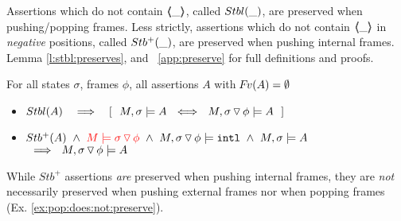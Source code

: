  

{Assertions} which do  not contain  $\langle\!\!\langle \_ \rangle\!\!\rangle$, called   ${Stbl( \_ )}$, are preserved when pushing/popping  frames.  
{Less strictly}, assertions which do  not contain $\langle\!\!\langle \_ \rangle\!\!\rangle$ in \emph{negative} positions, called ${Stb^+( \_ )}$,  are preserved when pushing  {internal} frames.
\Cf %
Lemma \ref{l:stbl:preserves}, and 
    \A\ \ref{app:preserve} for full definitions and proofs. 

\begin{lemma}
For all  states $\sigma$, frames $\phi$,   all assertions $A$ with  ${\hspace{-1pt}F\hspace{-1pt}}v(A)=\emptyset $
\label{l:preserve:asrt}
\label{l:stbl:preserves} 
\begin{itemize}
\item 
$\Stable{A} \  \ \  \Longrightarrow  \  \ \  [\ \ M, \sigma \models A \ \ \Longleftrightarrow \ \  M,{\PushSLong \phi \sigma} \models A\ \ ]$
\item 
\label{l:preserve:asrt:two}
${Stb^+( A )}   \ \wedge    \ \color{red}M \models {\ensuremath{ \sigma \, {\triangledown}\, \phi}} \color{black}\  \wedge\  M, { \sigma \, {\triangledown}\, \phi} \models  \mbox{\normalfont{\texttt{intl}}}\  \wedge  \ M, \sigma \models A $
$\  \ \Longrightarrow \  \ M,{ \sigma \, {\triangledown}\, \phi} \models A\ $
\end{itemize}
\end{lemma}


While $Stb^+$ assertions \emph{are} preserved  when pushing  internal frames,   they  are \emph{not} necessarily preserved when pushing  external frames  
nor when popping frames   (\cf Ex. \ref{ex:pop:does:not:preserve}). 



